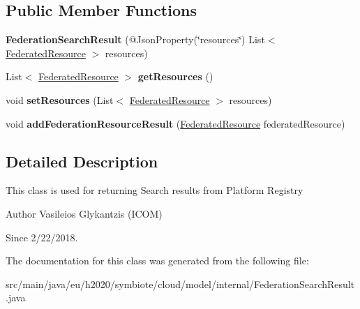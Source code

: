 \subsection*{Public Member Functions}
\begin{DoxyCompactItemize}
\item 
\mbox{\label{classeu_1_1h2020_1_1symbiote_1_1cloud_1_1model_1_1internal_1_1FederationSearchResult_a5a3a409a2443bca175071e4e11cd19c3}} 
{\bfseries Federation\+Search\+Result} (@Json\+Property(\char`\"{}resources\char`\"{}) List$<$ \hyperlink{classeu_1_1h2020_1_1symbiote_1_1cloud_1_1model_1_1internal_1_1FederatedResource}{Federated\+Resource} $>$ resources)
\item 
\mbox{\label{classeu_1_1h2020_1_1symbiote_1_1cloud_1_1model_1_1internal_1_1FederationSearchResult_a9e99429f3ca8369546a015196931f3f9}} 
List$<$ \hyperlink{classeu_1_1h2020_1_1symbiote_1_1cloud_1_1model_1_1internal_1_1FederatedResource}{Federated\+Resource} $>$ {\bfseries get\+Resources} ()
\item 
\mbox{\label{classeu_1_1h2020_1_1symbiote_1_1cloud_1_1model_1_1internal_1_1FederationSearchResult_a500db9cc7d702bdf722ff29471ca22d2}} 
void {\bfseries set\+Resources} (List$<$ \hyperlink{classeu_1_1h2020_1_1symbiote_1_1cloud_1_1model_1_1internal_1_1FederatedResource}{Federated\+Resource} $>$ resources)
\item 
\mbox{\label{classeu_1_1h2020_1_1symbiote_1_1cloud_1_1model_1_1internal_1_1FederationSearchResult_a5eb63e8e62086bb1aba172a10db783be}} 
void {\bfseries add\+Federation\+Resource\+Result} (\hyperlink{classeu_1_1h2020_1_1symbiote_1_1cloud_1_1model_1_1internal_1_1FederatedResource}{Federated\+Resource} federated\+Resource)
\end{DoxyCompactItemize}


\subsection{Detailed Description}
This class is used for returning Search results from Platform Registry

\begin{DoxyAuthor}{Author}
Vasileios Glykantzis (I\+C\+OM) 
\end{DoxyAuthor}
\begin{DoxySince}{Since}
2/22/2018. 
\end{DoxySince}


The documentation for this class was generated from the following file\+:\begin{DoxyCompactItemize}
\item 
src/main/java/eu/h2020/symbiote/cloud/model/internal/Federation\+Search\+Result.\+java\end{DoxyCompactItemize}
